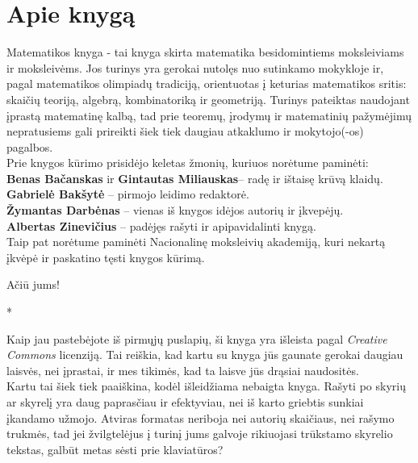 \thispagestyle{empty}
\section*{Apie knygą}

Matematikos knyga - tai knyga skirta matematika besidomintiems moksleiviams
ir moksleivėms. Jos turinys yra gerokai nutolęs nuo sutinkamo mokykloje ir,
pagal matematikos olimpiadų tradiciją, orientuotas į keturias matematikos
sritis: skaičių teoriją, algebrą, kombinatoriką ir geometriją.
Turinys pateiktas naudojant įprastą matematinę kalbą,
tad prie teoremų, įrodymų ir matematinių pažymėjimų nepratusiems gali
prireikti šiek tiek daugiau atkaklumo ir mokytojo(-os) pagalbos.\\

\noindent Prie knygos kūrimo prisidėjo keletas žmonių, kuriuos norėtume
paminėti:\\
\noindent \textbf{Benas Bačanskas} ir \textbf{Gintautas Miliauskas}-- radę ir ištaisę krūvą
klaidų.\\
\noindent \textbf{Gabrielė Bakšytė} -- pirmojo leidimo redaktorė. \\
\noindent \textbf{Žymantas Darbėnas} -- vienas iš knygos idėjos autorių ir
įkvepėjų.\\
\noindent \textbf{Albertas Zinevičius} -- padėjęs rašyti ir apipavidalinti
knygą.\\

\noindent Taip pat norėtume paminėti Nacionalinę moksleivių akademiją, kuri
nekartą įkvėpė ir paskatino tęsti knygos kūrimą.
\begin{flushright}Ačiū jums!\end{flushright}

\begin{center}*\end{center}

\noindent Kaip jau pastebėjote iš pirmųjų puslapių, ši knyga yra išleista pagal
\emph{Creative Commons} licenziją. Tai reiškia, kad kartu su knyga jūs
gaunate gerokai daugiau laisvės, nei įprastai, ir mes tikimės, kad ta laisve
jūs drąsiai naudositės. \\

\noindent Kartu tai šiek tiek paaiškina, kodėl išleidžiama nebaigta knyga. Rašyti po
skyrių ar skyrelį yra daug paprasčiau ir efektyviau, nei iš karto griebtis
sunkiai įkandamo užmojo. Atviras formatas neriboja nei autorių skaičiaus,
nei rašymo trukmės, tad jei žvilgtelėjus į turinį jums galvoje rikiuojasi
trūkstamo skyrelio tekstas, galbūt metas sėsti prie klaviatūros?

